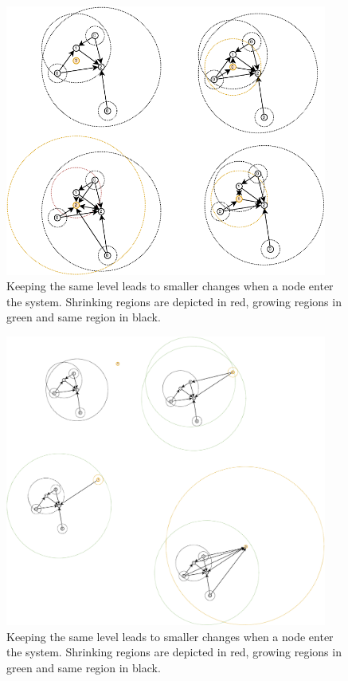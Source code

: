 \documentclass[a4paper,11pt,twoside,openright]{report}
\begin{document}
\begin{figure}[!h] 
\centering
\includegraphics[width=300pt]{figures/LocarnoTreaties-Insertion-close}
\caption{Keeping the same level leads to smaller changes when a node enter the
 system. Shrinking regions are depicted in red, growing regions in green and
 same region in black.} \label{fig:LocarnoTreaties-Insertion-close}
\end{figure}

\begin{figure}[!h] 
\centering
\includegraphics[width=300pt]{figures/LocarnoTreaties-Insertion-far}
\caption{Keeping the same level leads to smaller changes when a node enter the
 system. Shrinking regions are depicted in red, growing regions in green and
 same region in black.} \label{fig:LocarnoTreaties-Insertion-far}
\end{figure}
\end{document}
